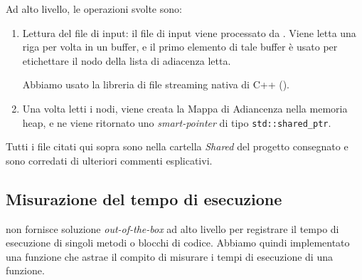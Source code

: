 Ad alto livello, le operazioni svolte sono:

\begin{enumerate}
    \item Lettura del file di input: il file di input viene processato da . Viene letta una riga per volta in un buffer, e il primo elemento di tale buffer è usato per etichettare il nodo della lista di adiacenza letta.

    \noindent Abbiamo usato la libreria di file streaming nativa di C++ ().

    \item Una volta letti i nodi, viene creata la Mappa di Adiancenza nella memoria heap, e ne viene ritornato uno \textit{smart-pointer} di tipo \texttt{std::shared_ptr}.
\end{enumerate}

\noindent Tutti i file citati qui sopra sono nella cartella \textit{Shared} del progetto consegnato e sono corredati di ulteriori commenti esplicativi.



\subsection{Misurazione del tempo di esecuzione}
\label{sub:stopwatch}

\noindent {} non fornisce soluzione \textit{out-of-the-box} ad alto livello per registrare il tempo di esecuzione di singoli metodi o blocchi di codice. Abbiamo quindi implementato una funzione  che astrae il compito di misurare i tempi di esecuzione di una funzione. \\

